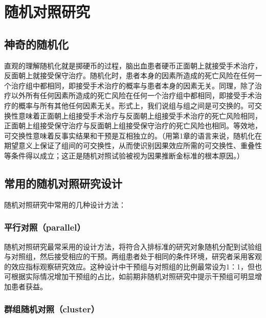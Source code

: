 \documentclass[
  chinese-hans,
  letterpaper,
  DIV=11,
  numbers=noendperiod]{scrreprt}
\begin{document}

\chapter{随机对照研究}\label{ux968fux673aux5bf9ux7167ux7814ux7a76}

\section{神奇的随机化}\label{ux795eux5947ux7684ux968fux673aux5316}

直观的理解随机化就是掷硬币的过程，脑出血患者硬币正面朝上就接受手术治疗，反面朝上就接受保守治疗。随机化时，患者本身的因素所造成的死亡风险在任何一个治疗组中都相同，即接受手术治疗的概率与患者本身的因素无关。同理，除了治疗以外所有任何因素所造成的死亡风险在任何一个治疗组中都相同，即接受手术治疗的概率与所有其他任何因素无关。形式上，我们说组与组之间是可交换的。可交换性意味着正面朝上组接受手术治疗与反面朝上组接受手术治疗的死亡风险相同，正面朝上组接受保守治疗与反面朝上组接受保守治疗的死亡风险也相同。等效地，可交换性意味着反事实结果和干预是互相独立的。（用第1章的语言来说，随机化在期望意义上保证了组间的可交换性，从而使识别因果效应所需的可交换性、重叠性等条件得以成立；这正是随机对照试验被视为因果推断金标准的根本原因。）

\section{常用的随机对照研究设计}\label{ux5e38ux7528ux7684ux968fux673aux5bf9ux7167ux7814ux7a76ux8bbeux8ba1}

随机对照研究中常用的几种设计方法：

\subsection{平行对照（parallel）}\label{ux5e73ux884cux5bf9ux7167parallel}

随机对照研究最常采用的设计方法，将符合入排标准的研究对象随机分配到试验组与对照组，然后接受相应的干预。两组患者处于相同的条件环境，研究者采用客观的效应指标观察研究效应。这种设计中干预组与对照组的比例最常设为1：1，但也可根据实际情况增加干预组的占比，如前期非随机对照研究中提示干预组可明显增加患者获益。

\subsection{群组随机对照（cluster）}\label{ux7fa4ux7ec4ux968fux673aux5bf9ux7167cluster}
\end{document}
